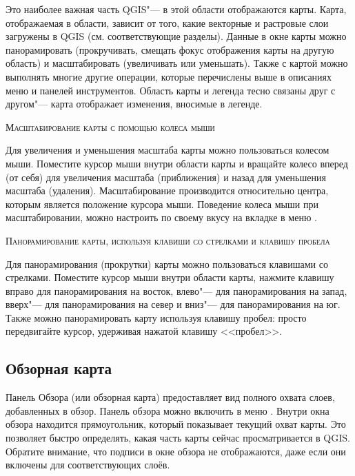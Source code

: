 Это наиболее важная часть QGIS"--- в этой области отображаются карты. Карта,
отображаемая в области, зависит от того, какие векторные и растровые
слои загружены в QGIS (см. соответствующие разделы). Данные в окне карты
можно панорамировать (прокручивать, смещать фокус отображения карты на
другую область) и масштабировать (увеличивать или уменьшать). Также с
картой можно выполнять многие другие операции, которые перечислены выше
в описаниях меню и панелей инструментов. Область карты и легенда тесно
связаны друг с другом"--- карта отображает изменения, вносимые в легенде.

\begin{Tip}\caption{\textsc{Масштабирование карты с помощью колеса мыши}}
Для увеличения и уменьшения масштаба карты можно пользоваться колесом мыши.
Поместите курсор мыши внутри области карты и вращайте колесо вперед (от себя)
для увеличения масштаба (приближения) и назад для уменьшения масштаба
(удаления). Масштабирование производится относительно центра, которым
является положение курсора мыши. Поведение колеса мыши при масштабировании,
можно настроить по своему вкусу на вкладке  в
меню  \arrow {}.
\end{Tip}

\begin{Tip}\caption{\textsc{Панорамирование карты, используя клавиши
со стрелками и клавишу пробела}}
Для панорамирования (прокрутки) карты можно пользоваться клавишами со стрелками.
Поместите курсор мыши внутри области карты, нажмите клавишу вправо
для панорамирования на восток, влево"--- для панорамирования
на запад, вверх"--- для панорамирования на север и вниз"--- для
панорамирования на юг. Также можно панорамировать карту используя клавишу
пробел: просто передвигайте курсор, удерживая нажатой клавишу <<пробел>>.
\end{Tip}

\subsection{Обзорная карта}\label{label_mapoverview}

Панель Обзора (или обзорная карта) предоставляет вид полного охвата слоев,
добавленных в обзор. Панель обзора можно включить в меню
 \arrow {}. Внутри окна обзора
находится прямоугольник, который показывает текущий охват карты. Это позволяет
быстро определять, какая часть карты сейчас просматривается в QGIS. Обратите
внимание, что подписи в окне обзора не отображаются, даже если они включены для
соответствующих слоёв.

